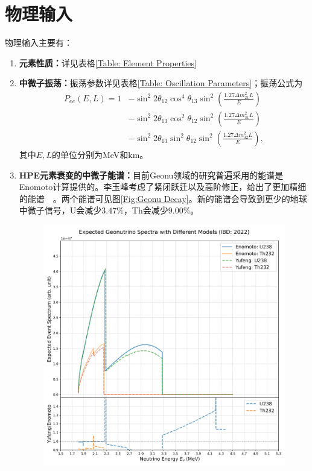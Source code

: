 		\section{物理输入}
			物理输入主要有：
				\begin{enumerate}
					\item \textbf{元素性质：}详见表格\ref{Table: Element Properties}
					\item \textbf{中微子振荡：}振荡参数详见表格\ref{Table: Oscillation Parameters}；振荡公式为
						\begin{equation}
							\begin{aligned}
								P_{ee}(E, L)
								= 1  
								&- \sin^2 2\theta_{12}\cos^4 \theta_{13} \sin^2\left(\frac{1.27 \Delta m_{21}^2 L}{E}\right) \\
								&- \sin^2 2\theta_{13}\cos^2 \theta_{12} \sin^2\left(\frac{1.27 \Delta m_{31}^2 L}{E}\right) \\
								&- \sin^2 2\theta_{13}\sin^2 \theta_{12} \sin^2\left(\frac{1.27 \Delta m_{32}^2 L}{E}\right),
							\end{aligned}
						\end{equation}
					其中$E, L$的单位分别为MeV和km。
					\item \textbf{HPE元素衰变的中微子能谱：}目前Geonu领域的研究普遍采用的能谱是Enomoto计算提供的\cite{Enomoto_Spectrum}。李玉峰考虑了紧闭跃迁以及高阶修正，给出了更加精细的能谱~~\cite{GeonSpectra-2024}。两个能谱可见图\ref{Fig:Geonu Decay}。新的能谱会导致到更少的地球中微子信号，U会减少$3.47\%$，Th会减少$9.00\%$。
						\begin{figure}[H]
							\centering
							\includegraphics[scale = 0.5]{./Pics/Comparison_All_Expected_Geonu_Spectra_IBD_2022.jpg}

\end{figure}
\end{enumerate}
